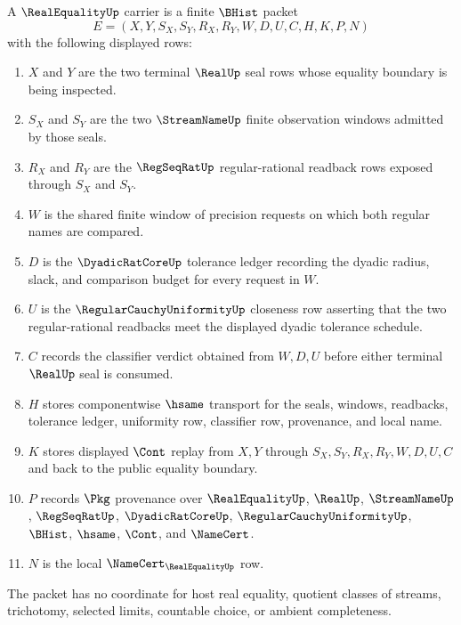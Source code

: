 \begin{definition}
\label{def:real-equality-carrier}
A $\RealEqualityUp$ carrier is a finite $\BHist$ packet
$$
E=(X,Y,S_X,S_Y,R_X,R_Y,W,D,U,C,H,K,P,N)
$$
with the following displayed rows:
\begin{enumerate}
\item $X$ and $Y$ are the two terminal $\RealUp$ seal rows whose equality boundary is being inspected.
\item $S_X$ and $S_Y$ are the two $\StreamNameUp$ finite observation windows admitted by those seals.
\item $R_X$ and $R_Y$ are the $\RegSeqRatUp$ regular-rational readback rows exposed through $S_X$ and $S_Y$.
\item $W$ is the shared finite window of precision requests on which both regular names are compared.
\item $D$ is the $\DyadicRatCoreUp$ tolerance ledger recording the dyadic radius, slack, and comparison budget for every request in $W$.
\item $U$ is the $\RegularCauchyUniformityUp$ closeness row asserting that the two regular-rational readbacks meet the displayed dyadic tolerance schedule.
\item $C$ records the classifier verdict obtained from $W,D,U$ before either terminal $\RealUp$ seal is consumed.
\item $H$ stores componentwise $\hsame$ transport for the seals, windows, readbacks, tolerance ledger, uniformity row, classifier row, provenance, and local name.
\item $K$ stores displayed $\Cont$ replay from $X,Y$ through $S_X,S_Y,R_X,R_Y,W,D,U,C$ and back to the public equality boundary.
\item $P$ records $\Pkg$ provenance over $\RealEqualityUp$, $\RealUp$, $\StreamNameUp$, $\RegSeqRatUp$, $\DyadicRatCoreUp$, $\RegularCauchyUniformityUp$, $\BHist$, $\hsame$, $\Cont$, and $\NameCert$.
\item $N$ is the local $\NameCert_{\RealEqualityUp}$ row.
\end{enumerate}
The packet has no coordinate for host real equality, quotient classes of streams, trichotomy, selected limits, countable choice, or ambient completeness.
\end{definition}

